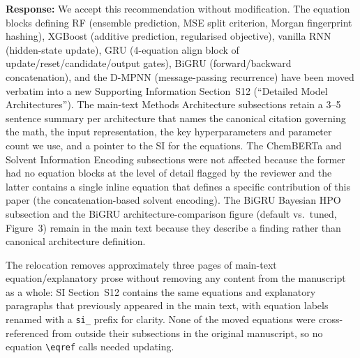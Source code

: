 \documentclass[11pt]{article}
\newcommand{\response}[1]{\noindent\textbf{Response:} #1\par\medskip}
\begin{document}
\response{We accept this recommendation without modification. The equation blocks defining RF (ensemble prediction, MSE split criterion, Morgan fingerprint hashing), XGBoost (additive prediction, regularised objective), vanilla RNN (hidden-state update), GRU (4-equation align block of update/reset/candidate/output gates), BiGRU (forward/backward concatenation), and the D-MPNN (message-passing recurrence) have been moved verbatim into a new Supporting Information Section~S12 (``Detailed Model Architectures''). The main-text Methods Architecture subsections retain a 3--5 sentence summary per architecture that names the canonical citation governing the math, the input representation, the key hyperparameters and parameter count we use, and a pointer to the SI for the equations. The ChemBERTa and Solvent Information Encoding subsections were not affected because the former had no equation blocks at the level of detail flagged by the reviewer and the latter contains a single inline equation that defines a specific contribution of this paper (the concatenation-based solvent encoding). The BiGRU Bayesian HPO subsection and the BiGRU architecture-comparison figure (default vs.\ tuned, Figure~3) remain in the main text because they describe a finding rather than canonical architecture definition.

The relocation removes approximately three pages of main-text equation/explanatory prose without removing any content from the manuscript as a whole: SI Section~S12 contains the same equations and explanatory paragraphs that previously appeared in the main text, with equation labels renamed with a \texttt{si\_} prefix for clarity. None of the moved equations were cross-referenced from outside their subsections in the original manuscript, so no equation \texttt{\textbackslash eqref} calls needed updating.}
\end{document}
